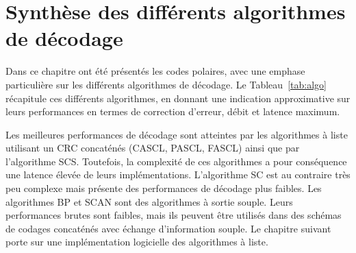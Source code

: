 \section{Synthèse des différents algorithmes de décodage}
 Dans ce chapitre ont été présentés les codes polaires, avec une emphase particulière sur les différents algorithmes de décodage. Le Tableau~\ref{tab:algo} récapitule ces différents algorithmes, en donnant une indication approximative sur leurs performances en termes de correction d'erreur, débit et latence maximum.
  \begin{table}[htp]
    \centering
    \caption{Tendances des différents algorithmes concernant leurs pouvoirs de correction, débits et latences.}
    \label{tab:algo}
    {\small{}}
  \end{table}



Les meilleures performances de décodage sont atteintes par les algorithmes à liste utilisant un CRC concaténés (CASCL, PASCL, FASCL) ainsi que par l'algorithme SCS. Toutefois, la complexité de ces algorithmes a pour conséquence une latence élevée de leurs implémentations. L'algorithme SC est au contraire très peu complexe mais présente des performances de décodage plus faibles. Les algorithmes BP et SCAN sont des algorithmes à sortie souple. Leurs performances brutes sont faibles, mais ils peuvent être utilisés dans des schémas de codages concaténés avec échange d'information souple. Le chapitre suivant porte sur une implémentation logicielle des algorithmes à liste.
